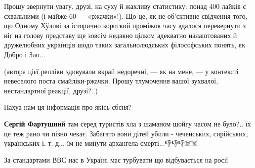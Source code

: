 \begin{itemize}
Прошу звернути увагу, друзі, на суху й жахливу статистику: понад 400 лайків є
схвальними (і майже 60 — «ржачки»!). Що це, як не об'єктивне свідчення того, що
Одному Хўлові за історично короткий проміжок часу вдалося перевернути з ніг на
голову представу ще зовсім недавно цілком адекватно налаштованих й дружелюбних
українців шодо таких загальнолюдських філософських понять, як Добро і Зло...

\begin{itemize}
 

(автора цієї репліки здивували вкрай недоречні, — як на мене, — у контексті
невеселого поста смайліки-ржачки. Прошу тлумочення вашої зухвалої,
нестандартної реакції, друзі?..)

\end{itemize}

 
Нахуа нам ця інформація про якісь єбєня?

\begin{itemize}
 
\textbf{Сергій Фартушний} там серед туристів хла з шаманом шойгу часом не
було?.. їх це теж рано чи пізно чекає. Забагато вони дітей
убили - чеченських, сирійських, українських і. т. д... їм не минути архангела
смерті...👎👎👎☠️☠️
\end{itemize}

 
За стандартами ВВС нас в Україні має турбувати що відбувається на росії


\end{itemize}
